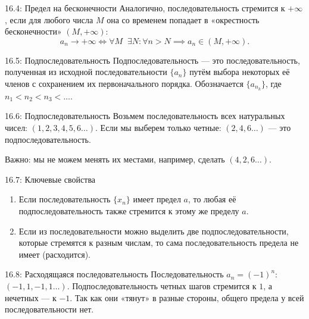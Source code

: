 \documentclass[a4paper,12pt]{article}
\begin{document}
	\begin{definitionbox}{16.4: Предел на бесконечности}
		Аналогично, последовательность стремится к $+\infty$, если для любого числа $M$ она со временем попадает в «окрестность бесконечности» $(M, +\infty)$:
		\[ a_n \to +\infty \iff \forall M \;\; \exists N \colon \forall n > N \implies a_n \in (M, +\infty) \text{.} \]
	\end{definitionbox}
	
	\begin{definitionbox}{16.5: Подпоследовательность}
		Подпоследовательность — это последовательность, полученная из исходной последовательности $\{a_n\}$ путём выбора некоторых её членов с сохранением их первоначального порядка. Обозначается $\{a_{n_k}\}$, где $n_1 < n_2 < n_3 < \dots$.
	\end{definitionbox}
	
	\begin{examplebox}{16.6: Подпоследовательность}
		Возьмем последовательность всех натуральных чисел: $(1, 2, 3, 4, 5, 6 \dots)$.
		Если мы выберем только четные: $(2, 4, 6 \dots)$ — это подпоследовательность.
		
		Важно: мы не можем менять их местами, например, сделать $(4, 2, 6 \dots)$.
	\end{examplebox}
	
	\begin{theorembox}{16.7: Ключевые свойства}
		\begin{enumerate}
			\item Если последовательность $\{x_n\}$ имеет предел $a$, то любая её подпоследовательность также стремится к этому же пределу $a$.
			\item Если из последовательности можно выделить две подпоследовательности, которые стремятся к разным числам, то сама последовательность предела не имеет (расходится).
		\end{enumerate}
	\end{theorembox}
	
	\begin{examplebox}{16.8: Расходящаяся последовательность}
		Последовательность $a_n = (-1)^n$: $(-1, 1, -1, 1 \dots)$.
		Подпоследовательность четных шагов стремится к $1$, а нечетных — к $-1$. Так как они «тянут» в разные стороны, общего предела у всей последовательности нет.
	\end{examplebox}
	
	\begin{center}
	\end{center}
	
\end{document}
